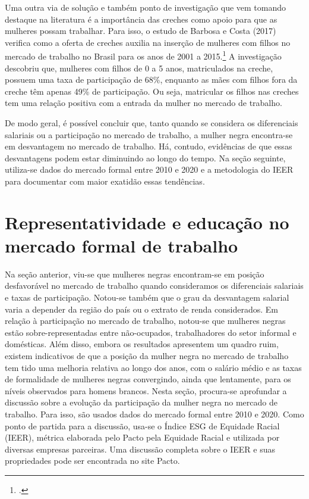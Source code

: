 \documentclass[12pt]{article}
\begin{document}
\par Uma outra via de solução e também ponto de investigação que vem tomando destaque na literatura é a importância das creches como apoio para que as mulheres possam trabalhar. Para isso, o estudo de  Barbosa e Costa (2017) verifica como a oferta de creches auxilia na inserção de mulheres com filhos no mercado de trabalho no Brasil para os anos de 2001 a 2015.\footcite{barbosacosta2017} A investigação descobriu que, mulheres com filhos de 0 a 5 anos, matriculados na creche, possuem uma taxa de participação de 68\%, enquanto as mães com filhos fora da creche têm apenas 49\% de participação. Ou seja, matricular os filhos nas creches tem uma relação positiva com a entrada da mulher no mercado de trabalho.

\par De modo geral, é possível concluir que, tanto quando se considera os diferenciais salariais ou a participação no mercado de trabalho, a mulher negra encontra-se em desvantagem no mercado de trabalho. Há, contudo, evidências de que essas desvantagens podem estar diminuindo ao longo do tempo. Na seção seguinte, utiliza-se dados do mercado formal entre 2010 e 2020 e a metodologia do IEER para documentar com maior exatidão essas tendências.


\section{Representatividade e educação no mercado formal de trabalho} \label{rais_representatividade}

\par Na seção anterior, viu-se que mulheres negras encontram-se em posição desfavorável no mercado de trabalho quando consideramos os diferenciais salariais e taxas de participação. Notou-se também que o grau da desvantagem salarial varia a depender da região do país ou o extrato de renda considerados. Em relação à participação no mercado de trabalho, notou-se que mulheres negras estão sobre-representadas entre não-ocupados, trabalhadores do setor informal e domésticas. Além disso, embora os resultados apresentem um quadro ruim, existem indicativos de que a posição da mulher negra no mercado de trabalho tem tido uma melhoria relativa ao longo dos anos, com o salário médio e as taxas de formalidade de mulheres negras convergindo, ainda que lentamente, para os níveis observados para homens brancos. Nesta seção, procura-se aprofundar a discussão sobre a evolução da participação da mulher negra no mercado de trabalho. Para isso, são usados dados do mercado formal entre 2010 e 2020. Como ponto de partida para a discussão, usa-se o Índice ESG de Equidade Racial (IEER), métrica elaborada pelo Pacto pela Equidade Racial e utilizada por diversas empresas parceiras. Uma discussão completa sobre o IEER e suas propriedades pode ser encontrada no site Pacto. 
\end{document}
